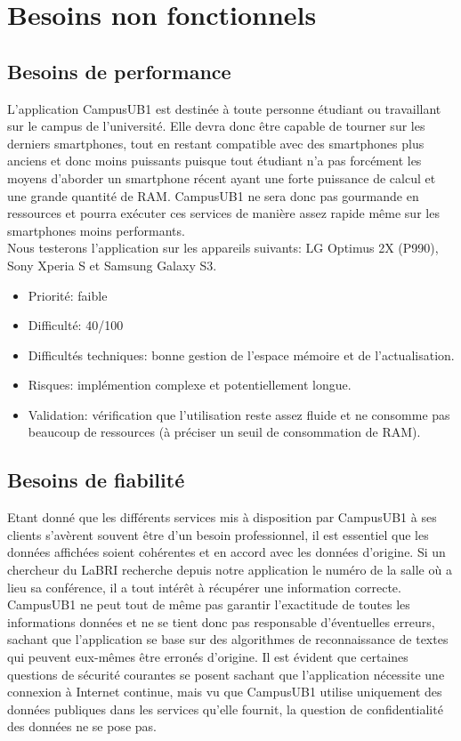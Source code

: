 \section{Besoins non fonctionnels}
\subsection{Besoins de performance}
L'application CampusUB1 est destinée à toute personne étudiant ou travaillant sur le campus de l'université. Elle devra donc être capable de tourner sur les derniers smartphones, tout en restant compatible avec des smartphones plus anciens et donc moins puissants puisque tout étudiant n'a pas forcément les moyens d'aborder un smartphone récent ayant une forte puissance de calcul et une grande quantité de RAM. CampusUB1 ne sera donc pas gourmande en ressources et pourra exécuter ces services de manière assez rapide même sur les smartphones moins performants.\\
Nous testerons l'application sur les appareils suivants: LG Optimus 2X (P990), Sony Xperia S et Samsung Galaxy S3.\\

\begin{itemize}
\renewcommand{\labelitemi}{$\bullet$}
\item Priorité: faible
\item Difficulté: 40/100
\item Difficultés techniques: bonne gestion de l'espace mémoire et de l'actualisation.
\item Risques: implémention complexe et potentiellement longue.
\item Validation: vérification que l'utilisation reste assez fluide et ne consomme pas beaucoup de ressources (à préciser un seuil de consommation de RAM).
\end{itemize}  

\subsection{Besoins de fiabilité}
Etant donné que les différents services mis à disposition par CampusUB1 à ses clients s'avèrent souvent être d'un besoin professionnel, il est essentiel que les données affichées soient cohérentes et en accord avec les données d'origine. Si un chercheur du LaBRI recherche depuis notre application le numéro de la salle où a lieu sa conférence, il a tout intérêt à récupérer une information correcte. CampusUB1 ne peut tout de même pas garantir l'exactitude de toutes les informations données et ne se tient donc pas responsable d'éventuelles erreurs, sachant que l'application se base sur des algorithmes de reconnaissance de textes qui peuvent eux-mêmes être erronés d'origine. Il est évident que certaines questions de sécurité courantes se posent sachant que l'application nécessite une connexion à Internet continue, mais vu que CampusUB1 utilise uniquement des données publiques dans les services qu'elle fournit, la question de confidentialité des données ne se pose pas. \\

